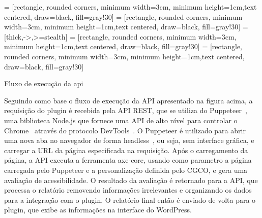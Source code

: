 \documentclass[12pt]{article}
\begin{document}
 = [rectangle, rounded corners, minimum width=3cm,
    minimum height=1cm,text centered, draw=black, fill=gray!30]
 = [rectangle, rounded corners, minimum width=3cm,
    minimum height=1cm,text centered, draw=black, fill=gray!30]
 = [thick,->,>=stealth]
 = [rectangle, rounded corners, minimum width=3cm,
    minimum height=1cm,text centered, draw=black, fill=gray!30]
 = [rectangle, rounded corners, minimum width=3cm,
    minimum height=1cm,text centered, draw=black, fill=gray!30]

Fluxo de execução da api
\bigbreak

Seguindo como base o fluxo de execução da API apresentado na figura
acima, a requisição do plugin é recebida pela API REST, que se utiliza
do Puppeteer~\autocite{puppeteer}, uma biblioteca Node.js que fornece uma
API de alto nível para controlar o Chrome~\autocite{chrome} através do protocolo
DevTools~\autocite{devtools}. O Puppeteer é utilizado para abrir uma nova aba no navegador de forma
headless~\autocite{headless}, ou seja, sem interface gráfica, e carregar a URL da página
especificada na requisição. Após o carregamento da página, a API
executa a ferramenta axe-core, usando como parametro a página carregada
pelo Puppeteer e a personalização definida pelo CGCO, e gera uma avaliação
de acessibilidade. O resultado da avaliação é retornado para a API, que
processa o relatório removendo informações irrelevantes e organizando os dados
para a integração com o plugin. O relatório final então é enviado de
volta para o plugin, que exibe as informações na interface do WordPress.
\end{document}
